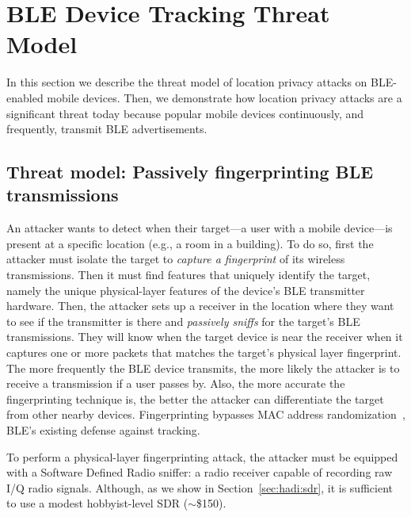 \section{BLE Device Tracking Threat Model}

\label{sec:threatmodel}

In this section we describe the threat model of location privacy attacks on
BLE-enabled mobile devices. Then, we demonstrate how location privacy attacks
are a significant threat today because popular mobile devices 
continuously, and frequently, transmit BLE advertisements.


\subsection{Threat model: Passively fingerprinting BLE transmissions}
%
An attacker wants to detect when their target---a user with a mobile
device---is present at a specific location (e.g., a room in a building).  To do
so, first the attacker must isolate the target to \emph{capture a fingerprint} of
its wireless transmissions. Then it must find features that uniquely
identify the target, namely the unique physical-layer features of the 
device's BLE transmitter hardware.
%
Then, the attacker sets up a receiver in the location where they want to see if
the transmitter is there and \emph{passively sniffs} for the target's BLE
transmissions. They will know when the target device is near the receiver when
it captures one or more packets that matches the target's physical layer
fingerprint.
%
The more frequently the BLE device transmits, the more likely the attacker is
to receive a transmission if a user passes by.  Also, the more accurate the
fingerprinting technique is, the better the attacker can differentiate the
target from other nearby devices.
%
Fingerprinting bypasses MAC address
randomization~\cite{bluetoothprivacy,MACRandomizationfail_Martin}, BLE's existing
defense against tracking.

To perform a physical-layer fingerprinting attack, the attacker must be
equipped with a Software Defined Radio sniffer: a radio receiver capable of
recording raw I/Q radio signals.
%
Although, as we show in Section~\ref{sec:hadi:sdr}, it is sufficient to use a
modest hobbyist-level SDR ($\sim$\$150).

